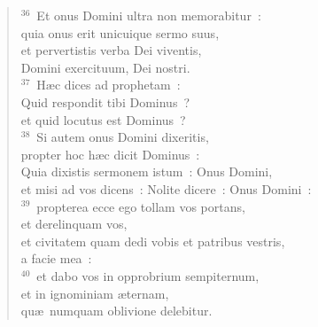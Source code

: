 \begin{flushleft}
\begin{verse}
${}^{36}$~Et onus Domini ultra non memorabitur~:\\ quia onus erit unicuique sermo suus,\\ et pervertistis verba Dei viventis,\\ Domini exercituum, Dei nostri.\\
${}^{37}$~H\ae c dices ad prophetam~:\\ Quid respondit tibi Dominus~?\\ et quid locutus est Dominus~?\\
${}^{38}$~Si autem onus Domini dixeritis,\\ propter hoc h\ae c dicit Dominus~:\\ Quia dixistis sermonem istum~: Onus Domini,\\ et misi ad vos dicens~: Nolite dicere~: Onus Domini~:\\
${}^{39}$~propterea ecce ego tollam vos portans,\\ et derelinquam vos,\\ et civitatem quam dedi vobis et patribus vestris,\\ a facie mea~:\\
${}^{40}$~et dabo vos in opprobrium sempiternum,\\ et in ignominiam \ae ternam,\\ qu\ae\ numquam oblivione delebitur.\end{verse}\end{flushleft}


